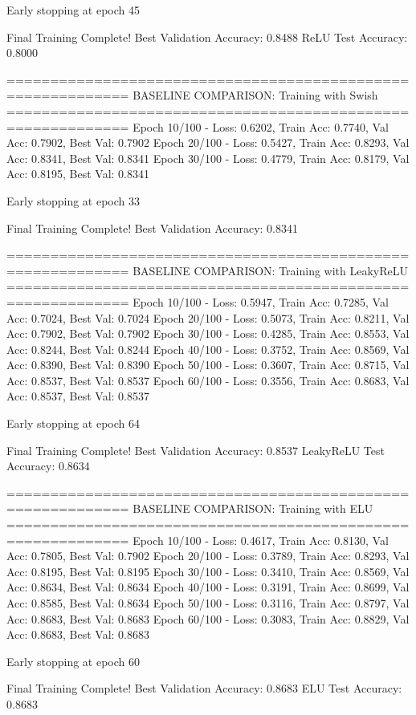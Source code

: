 Early stopping at epoch 45

Final Training Complete!
Best Validation Accuracy: 0.8488
ReLU Test Accuracy: 0.8000

============================================================
BASELINE COMPARISON: Training with Swish
============================================================
Epoch  10/100 - Loss: 0.6202, Train Acc: 0.7740, Val Acc: 0.7902, Best Val: 0.7902
Epoch  20/100 - Loss: 0.5427, Train Acc: 0.8293, Val Acc: 0.8341, Best Val: 0.8341
Epoch  30/100 - Loss: 0.4779, Train Acc: 0.8179, Val Acc: 0.8195, Best Val: 0.8341

Early stopping at epoch 33

Final Training Complete!
Best Validation Accuracy: 0.8341

============================================================
BASELINE COMPARISON: Training with LeakyReLU
============================================================
Epoch  10/100 - Loss: 0.5947, Train Acc: 0.7285, Val Acc: 0.7024, Best Val: 0.7024
Epoch  20/100 - Loss: 0.5073, Train Acc: 0.8211, Val Acc: 0.7902, Best Val: 0.7902
Epoch  30/100 - Loss: 0.4285, Train Acc: 0.8553, Val Acc: 0.8244, Best Val: 0.8244
Epoch  40/100 - Loss: 0.3752, Train Acc: 0.8569, Val Acc: 0.8390, Best Val: 0.8390
Epoch  50/100 - Loss: 0.3607, Train Acc: 0.8715, Val Acc: 0.8537, Best Val: 0.8537
Epoch  60/100 - Loss: 0.3556, Train Acc: 0.8683, Val Acc: 0.8537, Best Val: 0.8537

Early stopping at epoch 64

Final Training Complete!
Best Validation Accuracy: 0.8537
LeakyReLU Test Accuracy: 0.8634

============================================================
BASELINE COMPARISON: Training with ELU
============================================================
Epoch  10/100 - Loss: 0.4617, Train Acc: 0.8130, Val Acc: 0.7805, Best Val: 0.7902
Epoch  20/100 - Loss: 0.3789, Train Acc: 0.8293, Val Acc: 0.8195, Best Val: 0.8195
Epoch  30/100 - Loss: 0.3410, Train Acc: 0.8569, Val Acc: 0.8634, Best Val: 0.8634
Epoch  40/100 - Loss: 0.3191, Train Acc: 0.8699, Val Acc: 0.8585, Best Val: 0.8634
Epoch  50/100 - Loss: 0.3116, Train Acc: 0.8797, Val Acc: 0.8683, Best Val: 0.8683
Epoch  60/100 - Loss: 0.3083, Train Acc: 0.8829, Val Acc: 0.8683, Best Val: 0.8683

Early stopping at epoch 60

Final Training Complete!
Best Validation Accuracy: 0.8683
ELU Test Accuracy: 0.8683

